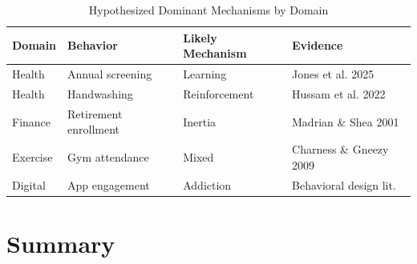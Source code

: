 \begin{table}[htbp]
\centering
\caption{Hypothesized Dominant Mechanisms by Domain}
\label{tab:hf-domain-mechanisms}
\renewcommand{\arraystretch}{1.3}
\begin{tabular}{@{}llll@{}}
\toprule
\textbf{Domain} & \textbf{Behavior} & \textbf{Likely Mechanism} & \textbf{Evidence} \\
\midrule
Health & Annual screening & Learning & Jones et al. 2025 \\
Health & Handwashing & Reinforcement & Hussam et al. 2022 \\
Finance & Retirement enrollment & Inertia & Madrian \& Shea 2001 \\
Exercise & Gym attendance & Mixed & Charness \& Gneezy 2009 \\
Digital & App engagement & Addiction & Behavioral design lit. \\
\bottomrule
\end{tabular}
\end{table}


\section{Summary}
\label{sec:hf-summary}

